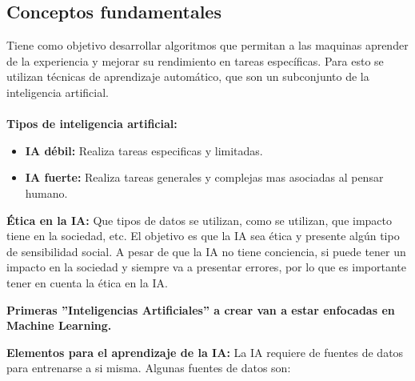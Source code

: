 \documentclass{templateNote}
\begin{document}
\subsection{Conceptos fundamentales}
Tiene como objetivo desarrollar algoritmos que permitan a las maquinas aprender de la experiencia y mejorar su rendimiento en tareas específicas. Para esto se utilizan técnicas de aprendizaje automático, que son un subconjunto de la inteligencia artificial.
\\\\\noindent
\textbf{Tipos de inteligencia artificial:}
\begin{itemize}
    \item \textbf{IA débil:} Realiza tareas especificas y limitadas.
    \item \textbf{IA fuerte:} Realiza tareas generales y complejas mas asociadas al pensar humano.
\end{itemize}
\noindent
\textbf{Ética en la IA:} Que tipos de datos se utilizan, como se utilizan, que impacto tiene en la sociedad, etc. El objetivo es que la IA sea ética y presente algún tipo de sensibilidad social. A pesar de que la IA no tiene conciencia, si puede tener un impacto en la sociedad y siempre va a presentar errores, por lo que es importante tener en cuenta la ética en la IA.

\begin{center}
\end{center}

\begin{tcolorbox}[colback=gray!5!yellow!40,colframe=gray!75!black]
    \noindent\textbf{Primeras ''Inteligencias Artificiales'' a crear van a estar enfocadas en Machine Learning.}
\end{tcolorbox}

\noindent
\textbf{Elementos para el aprendizaje de la IA:} La IA requiere de fuentes de datos para entrenarse a si misma. Algunas fuentes de datos son:
\end{document}
